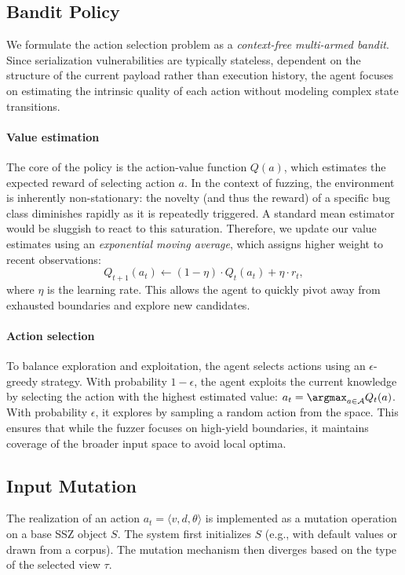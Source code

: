 \subsection{Bandit Policy}
\label{sec:policy_action}

We formulate the action selection problem as a \emph{context-free multi-armed bandit}. Since serialization vulnerabilities are typically stateless, dependent on the structure of the current payload rather than execution history, the agent focuses on estimating the intrinsic quality of each action without modeling complex state transitions.

\paragraph{Value estimation}
The core of the policy is the action-value function $Q(a)$, which estimates the expected reward of selecting action $a$. In the context of fuzzing, the environment is inherently non-stationary: the novelty (and thus the reward) of a specific bug class diminishes rapidly as it is repeatedly triggered. A standard mean estimator would be sluggish to react to this saturation. Therefore, we update our value estimates using an \emph{exponential moving average}, which assigns higher weight to recent observations:
\[
    Q_{t+1}(a_t) \leftarrow (1-\eta) \cdot Q_t(a_t) + \eta \cdot r_t,
\]
where $\eta$ is the learning rate. This allows the agent to quickly pivot away from exhausted boundaries and explore new candidates.

\paragraph{Action selection}
To balance exploration and exploitation, the agent selects actions using an $\epsilon$-greedy strategy. With probability $1-\epsilon$, the agent exploits the current knowledge by selecting the action with the highest estimated value: $a_t = \argmax_{a \in \mathcal{A}} Q_t(a)$. With probability $\epsilon$, it explores by sampling a random action from the space. This ensures that while the fuzzer focuses on high-yield boundaries, it maintains coverage of the broader input space to avoid local optima.

\subsection{Input Mutation}
\label{sec:concretization}

The realization of an action $a_t = \langle v, d, \theta \rangle$ is implemented as a mutation operation on a base SSZ object $S$. The system first initializes $S$ (e.g., with default values or drawn from a corpus). The mutation mechanism then diverges based on the type of the selected view $\tau$.

